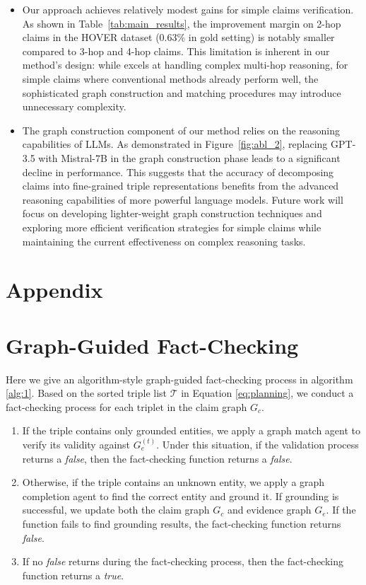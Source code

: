 \begin{itemize}
    \item  Our approach achieves relatively modest gains for simple claims verification. As shown in Table~\ref{tab:main_results}, the improvement margin on 2-hop claims in the HOVER dataset (0.63\% in gold setting) is notably smaller compared to 3-hop and 4-hop claims. This limitation is inherent in our method's design: while {\MyFC} excels at handling complex multi-hop reasoning, for simple claims where conventional methods already perform well, the sophisticated graph construction and matching procedures may introduce unnecessary complexity.
    \item The graph construction component of our method relies on the reasoning capabilities of LLMs. As demonstrated in Figure~\ref{fig:abl_2}, replacing GPT-3.5 with Mistral-7B in the graph construction phase leads to a significant decline in performance. This suggests that the accuracy of decomposing claims into fine-grained triple representations benefits from the advanced reasoning capabilities of more powerful language models. Future work will focus on developing lighter-weight graph construction techniques and exploring more efficient verification strategies for simple claims while maintaining the current effectiveness on complex reasoning tasks.
\end{itemize}




\appendix
\section*{Appendix}
\section{Graph-Guided Fact-Checking}\label{appendix:Fact-Checking over Graphs}
Here we give an algorithm-style graph-guided fact-checking process in algorithm \ref{alg:1}. Based on the sorted triple list $\mathcal{T}$ in Equation \ref{eq:planning}, we conduct a fact-checking process for each triplet in the claim graph $G_c$. 
\begin{enumerate}
    \item If the triple contains only grounded entities, we apply a graph match agent to verify its validity against \( G_e^{(t)} \). Under this situation, if the validation process returns a {\em false}, then the fact-checking function returns a {\em false}.
    \item Otherwise, if the triple contains an unknown entity, we apply a graph completion agent to find the correct entity and ground it. If grounding is successful, we update both the claim graph $G_c$ and evidence graph $G_e$. If the function fails to find grounding results, the fact-checking function returns {\em false}.
    \item  If no {\em false} returns during the fact-checking process, then the fact-checking function returns a {\em true}.
\end{enumerate}

